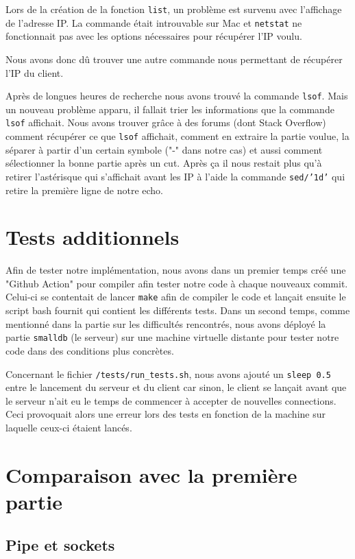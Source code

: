 \documentclass[utf8]{article}
\begin{document}
Lors de la création de la fonction \texttt{list}, un problème est survenu avec l'affichage de l'adresse IP. La commande  était introuvable sur Mac et \texttt{netstat} ne fonctionnait pas avec les options nécessaires pour récupérer l'IP voulu.

Nous avons donc dû trouver une autre commande nous permettant de récupérer l'IP du client.

Après de longues heures de recherche nous avons trouvé la commande \texttt{lsof}. Mais un nouveau problème apparu, il fallait trier les informations que la commande \texttt{lsof} affichait. Nous avons trouver grâce à des forums (dont Stack Overflow) comment récupérer ce que \texttt{lsof} affichait, comment en extraire la partie voulue, la séparer à partir d'un certain symbole ("-" dans notre cas) et aussi comment sélectionner la bonne partie après un cut. Après ça il nous restait plus qu'à retirer l'astérisque qui s'affichait avant les IP à l'aide la commande \texttt{sed/'1d'} qui retire la première ligne de notre echo.

\section{Tests additionnels}

Afin de tester notre implémentation, nous avons dans un premier temps créé une "Github Action" pour compiler afin tester notre code à chaque nouveaux commit. Celui-ci se contentait de lancer \texttt{make} afin de compiler le code et lançait ensuite le script bash fournit qui contient les différents tests. Dans un second temps, comme mentionné dans la partie sur les difficultés rencontrés, nous avons déployé la partie \texttt{smalldb} (le serveur) sur une machine virtuelle distante pour tester notre code dans des conditions plus concrètes.

Concernant le fichier \texttt{/tests/run\_tests.sh}, nous avons ajouté un \texttt{sleep 0.5} entre le lancement du serveur et du client car sinon, le client se lançait avant que le serveur n'ait eu le temps de commencer à accepter de nouvelles connections. Ceci provoquait alors une erreur lors des tests en fonction de la machine sur laquelle ceux-ci étaient lancés.

\section{Comparaison avec la première partie}

\subsection{Pipe et sockets}
\end{document}

